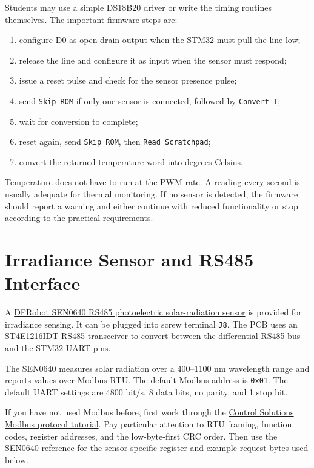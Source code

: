 \documentclass[11pt,a4paper]{article}
\newcommand{\code}[1]{\texttt{#1}}
\let\originalsection\section
\renewcommand{\section}{\clearpage\originalsection}
\begin{document}
Students may use a simple DS18B20 driver or write the timing routines themselves. The important firmware steps are:
\begin{enumerate}
  \item configure D0 as open-drain output when the STM32 must pull the line low;
  \item release the line and configure it as input when the sensor must respond;
  \item issue a reset pulse and check for the sensor presence pulse;
  \item send \code{Skip ROM} if only one sensor is connected, followed by \code{Convert T};
  \item wait for conversion to complete;
  \item reset again, send \code{Skip ROM}, then \code{Read Scratchpad};
  \item convert the returned temperature word into degrees Celsius.
\end{enumerate}

Temperature does not have to run at the PWM rate. A reading every second is usually adequate for thermal monitoring. If no sensor is detected, the firmware should report a warning and either continue with reduced functionality or stop according to the practical requirements.

\section{Irradiance Sensor and RS485 Interface}

A \href{https://wiki.dfrobot.com/sen0640/docs/20430}{DFRobot SEN0640 RS485 photoelectric solar-radiation sensor} is provided for irradiance sensing. It can be plugged into screw terminal \code{J8}. The PCB uses an \href{https://www.st.com/resource/en/datasheet/st4e1216.pdf}{ST4E1216IDT RS485 transceiver} to convert between the differential RS485 bus and the STM32 UART pins.

The SEN0640 measures solar radiation over a 400--1100 nm wavelength range and reports values over Modbus-RTU. The default Modbus address is \code{0x01}. The default UART settings are 4800 bit/s, 8 data bits, no parity, and 1 stop bit.

If you have not used Modbus before, first work through the \href{https://www.csimn.com/CSI_pages/Modbus101.html}{Control Solutions Modbus protocol tutorial}. Pay particular attention to RTU framing, function codes, register addresses, and the low-byte-first CRC order. Then use the SEN0640 reference for the sensor-specific register and example request bytes used below.
\end{document}
